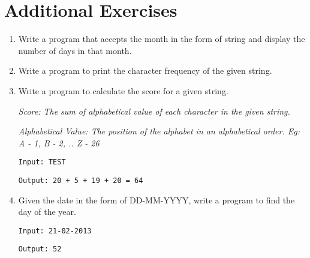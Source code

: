 \documentclass{book}
\begin{document}
\section{Additional Exercises}

\begin{enumerate}
\item{Write a program that accepts the month in the form of string and display the number of days in that month.}
\item{Write a program to print the character frequency of the given string.}
\item{Write a program to calculate the score for a given string.}
\par{\hspace*{15pt}\textit{Score: The sum of alphabetical value of each character in the given string.}}
\par{\hspace*{15pt}\textit{Alphabetical Value: The position of the alphabet in an alphabetical order. Eg: A - 1, B - 2, .. Z - 26}}\\
\par{\texttt{Input: TEST}}
\par{\texttt{Output: 20 + 5 + 19 + 20 = 64}}
\item{Given the date in the form of DD-MM-YYYY, write a program to find the day of the year.}
\par{\texttt{Input: 21-02-2013}}
\par{\texttt{Output: 52}}
\end{enumerate}
\end{document}
